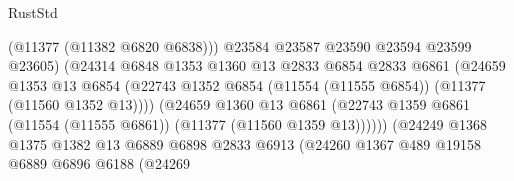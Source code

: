\begin{lexlean}{RustStd}
\begin{coremodule}
                                            (@11377 (@11382 @6820 @6838)))
                                          @23584
                                          @23587
                                          @23590
                                          @23594
                                          @23599
                                          @23605)
                                        (@24314
                                          @6848
                                          @1353
                                          @1360
                                          @13
                                          @2833
                                          @6854
                                          @2833
                                          @6861
                                          (@24659
                                            @1353
                                            @13
                                            @6854
                                            (@22743
                                              @1352
                                              @6854
                                              (@11554 (@11555 @6854))
                                              (@11377 (@11560 @1352 @13))))
                                          (@24659
                                            @1360
                                            @13
                                            @6861
                                            (@22743
                                              @1359
                                              @6861
                                              (@11554 (@11555 @6861))
                                              (@11377 (@11560 @1359 @13))))))
                                      (@24249
                                        @1368
                                        @1375
                                        @1382
                                        @13
                                        @6889
                                        @6898
                                        @2833
                                        @6913
                                        (@24260
                                          @1367
                                          @489
                                          @19158
                                          @6889
                                          @6896
                                          @6188
                                          (@24269

\end{coremodule}
\end{lexlean}
